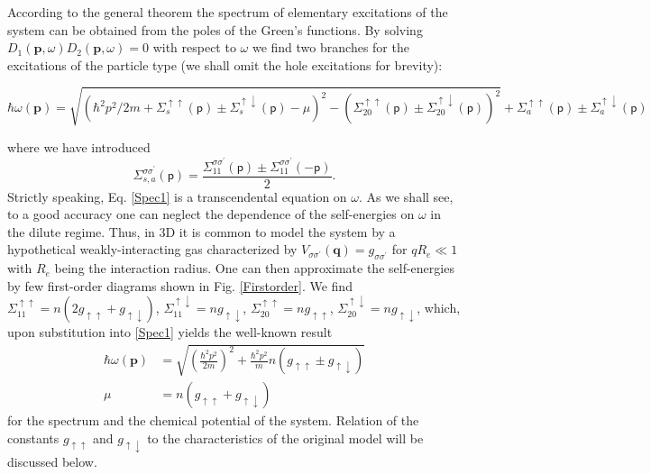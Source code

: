 \documentclass[reprint,superscriptaddress,showpacs,nofootinbib,aps,pra]{revtex4-1}
\begin{document}
According to the general theorem \cite{AGD} the spectrum of elementary excitations of the system can be obtained from the poles of the Green's functions. By solving $D_1(\bm p,\omega)D_2(\bm p,\omega)=0$ with respect to $\omega$ we find two branches for the excitations of the particle type (we shall omit the hole excitations for brevity):
\begin{widetext}
\begin{equation}
\label{Spec1}
\hbar\omega(\bm p)=\sqrt{(\hbar^2 p^2/2m+\Sigma_s^{\uparrow\uparrow}(\mathsf p)\pm\Sigma_s^{\uparrow\downarrow}(\mathsf p)-\mu)^2-(\Sigma^{\uparrow \uparrow}_{20}(\mathsf p) \pm \Sigma^{\uparrow \downarrow}_{20}(\mathsf p))^2}+\Sigma_a^{\uparrow\uparrow}(\mathsf p)\pm\Sigma_a^{\uparrow\downarrow}(\mathsf p)
\end{equation}
\end{widetext}
where we have introduced
\begin{equation}
\Sigma_{s,a}^{\sigma\sigma^\prime}(\mathsf p)=\frac{\Sigma^{\sigma\sigma^\prime}_{11}(\mathsf p)\pm\Sigma^{\sigma\sigma^\prime}_{11}(-\mathsf p)}{2}.
\end{equation} 
Strictly speaking, Eq. \eqref{Spec1} is a transcendental equation on $\omega$. As we shall see, to a good accuracy one can neglect the dependence of the self-energies on $\omega$ in the dilute regime. Thus, in 3D it is common to model the system by a hypothetical weakly-interacting gas characterized by $V_{\sigma\sigma^\prime}(\bm q)=g_{\sigma\sigma^\prime}$ for $q R_e\ll 1$ with $R_e$ being the interaction radius. One can then approximate the self-energies by few first-order diagrams shown in Fig. \ref{Firstorder}. We find $\Sigma^{\uparrow \uparrow}_{11}=n(2g_{\uparrow \uparrow}+g_{\uparrow \downarrow})$, $\Sigma^{\uparrow \downarrow}_{11}=n g_{\uparrow \downarrow}$, $\Sigma^{\uparrow \uparrow}_{20}= n g_{\uparrow \uparrow}$, $\Sigma^{\uparrow \downarrow}_{20}= n g_{\uparrow \downarrow}$, which, upon substitution into \eqref{Spec1} yields the well-known result
\begin{subequations}\label{SpecB1}
\begin{align}
\hbar\omega(\bm p)&=\sqrt{\left( \frac{\hbar^2 p^2}{2m} \right)^2 + \frac{\hbar^2p^2}{m}n(g_{\uparrow\uparrow}\pm g_{\uparrow\downarrow})}\\
\mu&=n(g_{\uparrow \uparrow}+g_{\uparrow \downarrow})
\end{align}
\end{subequations}
for the spectrum and the chemical potential of the system. Relation of the constants $g_{\uparrow \uparrow}$ and $g_{\uparrow \downarrow}$ to the characteristics of the original model will be discussed below.
\end{document}
